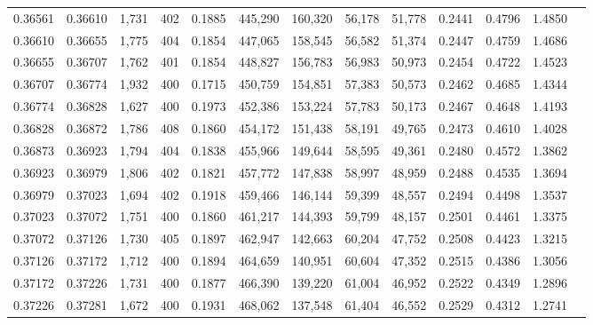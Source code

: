 \begin{tabular}{rrrrrrrrrrrrr}
0.36561 & 0.36610 &  1,731 & 402 &                                     0.1885 & 445,290 & 160,320 &  56,178 &  51,778 & 0.2441 & 0.4796 & 1.4850 \\
0.36610 & 0.36655 &  1,775 & 404 &                                     0.1854 & 447,065 & 158,545 &  56,582 &  51,374 & 0.2447 & 0.4759 & 1.4686 \\
0.36655 & 0.36707 &  1,762 & 401 &                                     0.1854 & 448,827 & 156,783 &  56,983 &  50,973 & 0.2454 & 0.4722 & 1.4523 \\
0.36707 & 0.36774 &  1,932 & 400 &                                     0.1715 & 450,759 & 154,851 &  57,383 &  50,573 & 0.2462 & 0.4685 & 1.4344 \\
0.36774 & 0.36828 &  1,627 & 400 &                                     0.1973 & 452,386 & 153,224 &  57,783 &  50,173 & 0.2467 & 0.4648 & 1.4193 \\
0.36828 & 0.36872 &  1,786 & 408 &                                     0.1860 & 454,172 & 151,438 &  58,191 &  49,765 & 0.2473 & 0.4610 & 1.4028 \\
0.36873 & 0.36923 &  1,794 & 404 &                                     0.1838 & 455,966 & 149,644 &  58,595 &  49,361 & 0.2480 & 0.4572 & 1.3862 \\
0.36923 & 0.36979 &  1,806 & 402 &                                     0.1821 & 457,772 & 147,838 &  58,997 &  48,959 & 0.2488 & 0.4535 & 1.3694 \\
0.36979 & 0.37023 &  1,694 & 402 &                                     0.1918 & 459,466 & 146,144 &  59,399 &  48,557 & 0.2494 & 0.4498 & 1.3537 \\
0.37023 & 0.37072 &  1,751 & 400 &                                     0.1860 & 461,217 & 144,393 &  59,799 &  48,157 & 0.2501 & 0.4461 & 1.3375 \\
0.37072 & 0.37126 &  1,730 & 405 &                                     0.1897 & 462,947 & 142,663 &  60,204 &  47,752 & 0.2508 & 0.4423 & 1.3215 \\
0.37126 & 0.37172 &  1,712 & 400 &                                     0.1894 & 464,659 & 140,951 &  60,604 &  47,352 & 0.2515 & 0.4386 & 1.3056 \\
0.37172 & 0.37226 &  1,731 & 400 &                                     0.1877 & 466,390 & 139,220 &  61,004 &  46,952 & 0.2522 & 0.4349 & 1.2896 \\
0.37226 & 0.37281 &  1,672 & 400 &                                     0.1931 & 468,062 & 137,548 &  61,404 &  46,552 & 0.2529 & 0.4312 & 1.2741 \\

\end{tabular}
